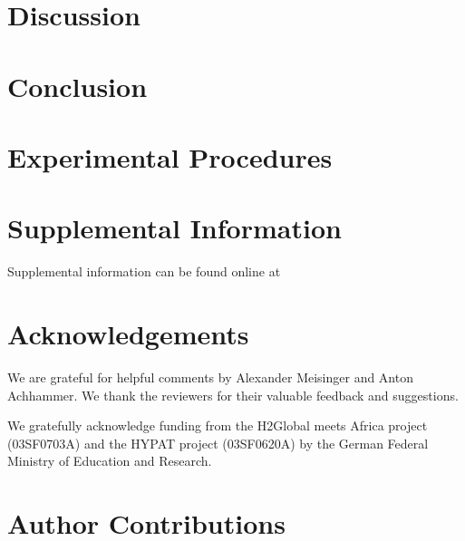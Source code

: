\documentclass[5p,numafflabel]{elsarticle}
\begin{document}


\section*{Discussion}
\label{sec:discussion}



\section*{Conclusion}
\label{sec:conclusion}



\section*{Experimental Procedures}
\label{sec:methods}








\section*{Supplemental Information}

Supplemental information can be found online at %

\section*{Acknowledgements}

We are grateful for helpful comments by Alexander Meisinger and Anton Achhammer.
We thank the reviewers for their valuable feedback and suggestions. 

We gratefully acknowledge funding from the H2Global meets Africa project (03SF0703A) and the HYPAT project (03SF0620A) by the German Federal Ministry of Education and Research.



\section*{Author Contributions}
\end{document}
